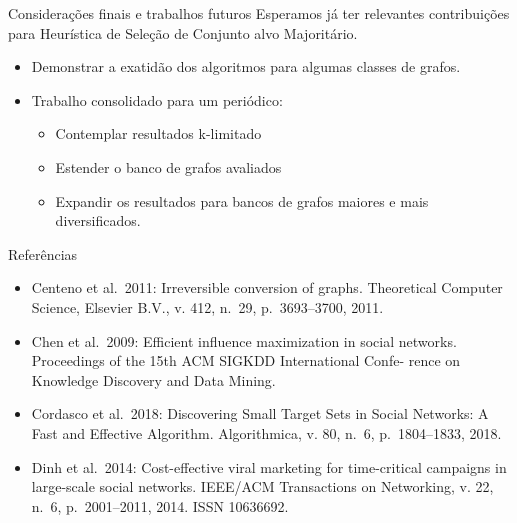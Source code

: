 \documentclass{beamer}
\begin{document}
\begin{frame}{Considerações finais e trabalhos futuros}
Esperamos já ter relevantes contribuições para Heurística de Seleção de Conjunto alvo Majoritário.

\begin{itemize}
\tightlist
\item
  Demonstrar a exatidão dos algoritmos para algumas classes de grafos.
\item
  Trabalho consolidado para um periódico:

  \begin{itemize}
  \tightlist
  \item
    Contemplar resultados k-limitado
  \item
    Estender o banco de grafos avaliados
  \item 
  Expandir os resultados para bancos de grafos maiores e mais diversificados. 
 \end{itemize}
\end{itemize}
\end{frame}

\begin{frame}{Referências}
\protect\hypertarget{referuxeancias}{}
\begin{itemize}
\item
  Centeno et al.~2011: Irreversible conversion of graphs. Theoretical
  Computer Science, Elsevier B.V., v. 412, n.~29, p.~3693--3700, 2011.
\item
  Chen et al.~2009: Efficient influence maximization in social networks.
  Proceedings of the 15th ACM SIGKDD International Confe- rence on
  Knowledge Discovery and Data Mining.
\item
  Cordasco et al.~2018: Discovering Small Target Sets in Social
  Networks: A Fast and Effective Algorithm. Algorithmica, v. 80, n.~6,
  p.~1804--1833, 2018.
\item
  Dinh et al.~2014: Cost-effective viral marketing for time-critical
  campaigns in large-scale social networks. IEEE/ACM Transactions on
  Networking, v. 22, n.~6, p.~2001--2011, 2014. ISSN 10636692.
\end{itemize}
\end{frame}
\end{document}

